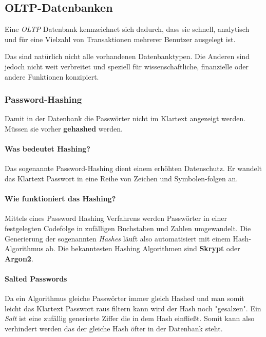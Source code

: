 \subsection{OLTP-Datenbanken}
Eine \textit{OLTP} Datenbank kennzeichnet sich dadurch, dass sie schnell, analytisch und für eine
Vielzahl von Transaktionen mehrerer Benutzer ausgelegt ist.

Das sind natürlich nicht alle vorhandenen Datenbanktypen. Die Anderen sind jedoch
nicht weit verbreitet und speziell für wissenschaftliche, finanzielle oder andere Funktionen konzipiert.

\subsubsection{Password-Hashing}
Damit in der Datenbank die Passwörter nicht im Klartext angezeigt werden.
Müssen sie vorher \textbf{gehashed} werden.

\paragraph{Was bedeutet Hashing?}
Das sogenannte Password-Hashing dient einem erhöhten Datenschutz. Er
wandelt das Klartext Passwort in eine Reihe von Zeichen und Symbolen-folgen an.

\paragraph{Wie funktioniert das Hashing?}
Mittels eines Password Hashing Verfahrens werden Passwörter in einer festgelegten
Codefolge in zufälligen Buchstaben und Zahlen umgewandelt. Die Generierung der
sogenannten \textit{Hashes} läuft also automatisiert mit einem Hash-Algorithmus ab.
Die bekanntesten Hashing Algorithmen sind \textbf{Skrypt} oder \textbf{Argon2}.

\paragraph{Salted Passwords}
Da ein Algorithmus gleiche Passwörter immer gleich Hashed und man somit leicht
das Klartext Passwort raus filtern kann wird der Hash noch "gesalzen". Ein \textit{Salt}
ist eine zufällig generierte Ziffer die in dem Hash einfließt. Somit kann also verhindert
werden das der gleiche Hash öfter in der Datenbank steht.
\cite{Hashing}


